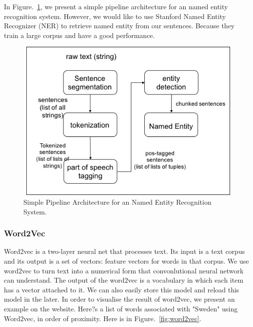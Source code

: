 \documentclass[10pt,twocolumn,letterpaper]{article}
\begin{document}
In Figure.~\ref{fig:pipeline}, we present a simple pipeline architecture for an named entity recognition system. However, we would like to use Stanford Named Entity Recognizer (NER) to retrieve named entity from our sentences. Because they train a large corpus and have a good performance.
\begin{figure}
\includegraphics[width=\linewidth]{pipeline}
\caption{Simple Pipeline Architecture for an Named Entity Recognition System. }
\label{fig:pipeline}
\end{figure}

\subsubsection{Word2Vec}
Word2vec is a two-layer neural net that processes text. Its input is a text corpus and its output is a set of vectors: feature vectors for words in that corpus. We use word2vec to turn text into a numerical form that convonlutional neural network can understand. The output of the word2vec is a vocabulary in which each item has a vector attached to it. We can also easily store this model and reload this model in the later. In order to visualise the result of word2vec, we present an example on the website. Here?s a list of words associated with "Sweden" using Word2vec, in order of proximity. Here is in Figure.~\ref{fig:word2vec}.
\end{document}
